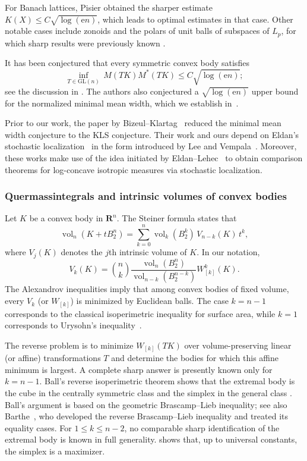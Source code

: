 \documentclass[11pt]{amsart}
\newcommand{\R}{\mathbf R}
\newcommand{\Vol}{\operatorname{vol}}
\newcommand{\GL}{\mathrm{GL}}
\newcommand{\1}{\mathbf 1}
\newcommand{\e}{\mathrm{e}}
\let\vol\Vol
\theoremstyle{plain}
\begin{document}
For Banach lattices, Pisier obtained the sharper estimate
$K(X)\leq C\sqrt{\log(\e n)}$, which leads to optimal estimates in that case. Other notable cases include zonoids and the polars of unit balls of subspaces of $L_{p}$, for which sharp results were previously known \cite{GiaMilRud00,PaoVal18}.

It has been conjectured that every symmetric convex body satisfies
$$
\inf_{T\in \GL(n)} \, M(TK)M^\ast(TK)\leq C\sqrt{\log(\e n)};$$
see the discussion in \cite[p.~207]{AubSza17}. The authors also conjectured a $\sqrt{\log (\e n)}$ upper bound for the normalized minimal mean width, which we establish in~.

Prior to our work, the paper by Bizeul--Klartag~\cite{BizKla26} reduced the minimal mean width conjecture to the KLS conjecture. Their work and ours depend on Eldan's stochastic localization~\cite{Eld12, Eld13} in the form introduced by Lee and Vempala~\cite{LeeVem24}. Moreover, these works make use of the idea initiated by Eldan--Lehec~\cite{EldLeh14} to obtain comparison theorems for log-concave isotropic measures via stochastic localization.

\subsubsection{Quermassintegrals and intrinsic volumes of convex bodies}
\label{sec:quermassintegrals}

Let $K$ be a convex body in $\R^{n}$. The Steiner formula states that
\[
\vol_n(K+tB_2^n)
=\sum_{k=0}^{n} \vol_k(B_{2}^{k}) \, V_{n-k}(K) \, t^{k},
\]
where $V_j(K)$ denotes the $j$th intrinsic volume of $K$. In our notation,
\[
V_{k}(K) = \binom{n}{k} \frac{\vol_n(B_{2}^{n})}{ \vol_{n-k}(B_{2}^{n-k})} W_{[k]}^{k}(K). 
\]
The Alexandrov inequalities imply that among convex bodies of fixed volume, every $V_k$ (or $W_{[k]}$) is minimized by Euclidean balls. The case $k=n-1$ corresponds to the classical isoperimetric inequality for surface area, while $k=1$ corresponds to Urysohn's inequality~\cite[Theorem~7.3.1]{Sch14}.

The reverse problem is to minimize $W_{[k]}(TK)$ over volume-preserving linear (or affine) transformations $T$ and determine the bodies for which this affine minimum is largest. A complete sharp answer is presently known only for $k=n-1$. Ball's reverse isoperimetric theorem shows that the extremal body is the cube in the centrally symmetric class and the simplex in the general class \cite{Ball91}. Ball's argument is based on the geometric Brascamp--Lieb inequality; see also Barthe~\cite{Bar98}, who developed the reverse Brascamp--Lieb inequality and treated its equality cases. For $1\leq k\leq n-2$, no comparable sharp identification of the extremal body is known in full generality.  shows that, up to universal constants, the simplex is a maximizer.
\end{document}
